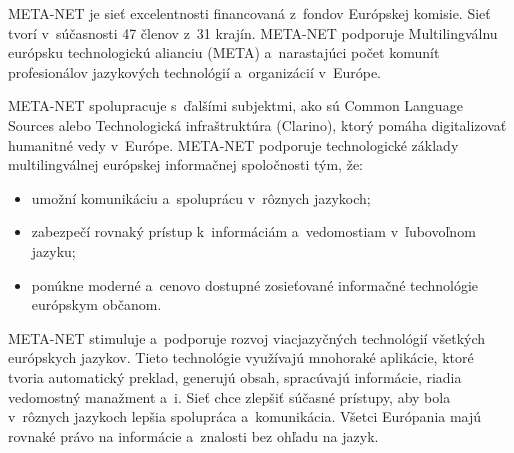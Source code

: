 META-NET je sieť excelentnosti financovaná z~fondov Európskej komisie. Sieť tvorí v~súčasnosti 47 členov z~31 krajín. META-NET podporuje Multilingválnu európsku technologickú alianciu (META) a~narastajúci počet komunít profesionálov jazykových technológií a~organizácií v~Európe.


META-NET spolupracuje s~ďalšími subjektmi, ako sú Common Language Sources alebo Technologická infraštruktúra (Clarino), ktorý pomáha digitalizovať humanitné vedy v~Európe. META-NET podporuje technologické základy multilingválnej európskej informačnej spoločnosti tým, že:

\begin{itemize}
\item umožní komunikáciu a~spoluprácu v~rôznych jazykoch;
\item zabezpečí rovnaký prístup k~informáciám a~vedomostiam v~ľubovoľnom jazyku;
\item ponúkne moderné a~cenovo dostupné zosieťované informačné technológie európskym občanom. 
\end{itemize}

META-NET stimuluje a~podporuje rozvoj viacjazyčných technológií všetkých európskych jazykov. Tieto technológie využívajú mnohoraké aplikácie, ktoré tvoria automatický preklad, generujú obsah, spracúvajú informácie, riadia vedomostný manažment a~i. Sieť chce zlepšiť súčasné prístupy, aby bola v~rôznych jazykoch lepšia spolupráca a~komunikácia. Všetci Európania majú rovnaké právo na informácie a~znalosti bez ohľadu na jazyk.

